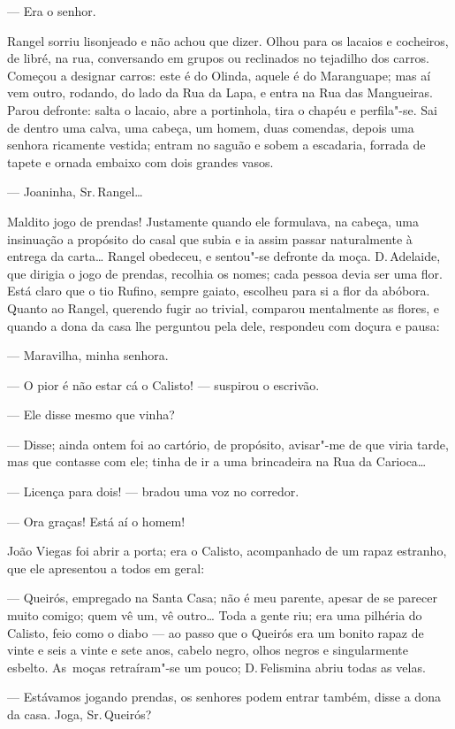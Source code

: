 \begin{linenumbers}
--- Era o senhor.

Rangel sorriu lisonjeado e não achou que dizer. Olhou para os lacaios e
cocheiros, de libré, na rua, conversando em grupos ou reclinados no
tejadilho dos carros. Começou a designar carros: este é do Olinda,
aquele é do Maranguape; mas aí vem outro, rodando, do lado da Rua da
Lapa, e entra na Rua das Mangueiras. Parou defronte: salta o lacaio,
abre a portinhola, tira o chapéu e perfila"-se. Sai de dentro uma calva,
uma cabeça, um homem, duas comendas, depois uma senhora ricamente
vestida; entram no saguão e sobem a escadaria, forrada de tapete e
ornada embaixo com dois grandes vasos.

--- Joaninha, Sr.\,Rangel\ldots{}

Maldito jogo de prendas! Justamente quando ele formulava, na cabeça, uma
insinuação a propósito do casal que subia e ia assim passar naturalmente
à entrega da carta\ldots{} Rangel obedeceu, e sentou"-se defronte da moça. D.\,Adelaide, que dirigia o jogo de prendas, recolhia os nomes; cada pessoa
devia ser uma flor. Está claro que o tio Rufino, sempre gaiato, escolheu
para si a flor da abóbora. Quanto ao Rangel, querendo fugir ao trivial,
comparou mentalmente as flores, e quando a dona da casa lhe perguntou
pela dele, respondeu com doçura e pausa:

--- Maravilha, minha senhora.

--- O pior é não estar cá o Calisto! --- suspirou o escrivão.

--- Ele disse mesmo que vinha?

--- Disse; ainda ontem foi ao cartório, de propósito, avisar"-me de que
viria tarde, mas que contasse com ele; tinha de ir a uma brincadeira na
Rua da Carioca\ldots{}

--- Licença para dois! --- bradou uma voz no corredor.

--- Ora graças! Está aí o homem!

João Viegas foi abrir a porta; era o Calisto, acompanhado de um rapaz
estranho, que ele apresentou a todos em geral:

--- Queirós, empregado na Santa Casa; não é meu parente, apesar de se
parecer muito comigo; quem vê um, vê outro\ldots{} Toda a gente riu; era uma
pilhéria do Calisto, feio como o diabo --- ao passo que o Queirós era um
bonito rapaz de vinte e seis a vinte e sete anos, cabelo negro, olhos
negros e singularmente esbelto. As~moças retraíram"-se um pouco; D.\,Felismina abriu todas as velas.

--- Estávamos jogando prendas, os senhores podem entrar também, disse a
dona da casa. Joga, Sr.\,Queirós?


\end{linenumbers}
